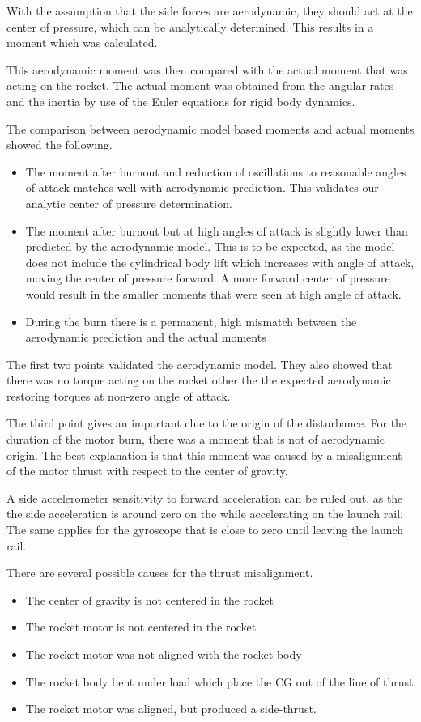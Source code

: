 With the assumption that the side forces are aerodynamic, they should act at the center of pressure, which can be analytically determined.
This results in a moment which was calculated.

This aerodynamic moment was then compared with the actual moment that was acting on the rocket.
The actual moment was obtained from the angular rates and the inertia by use of the Euler equations for rigid body dynamics.

The comparison between aerodynamic model based moments and actual moments showed the following.
\begin{itemize}
\item The moment after burnout and reduction of oscillations to reasonable angles of attack matches well with aerodynamic prediction. This validates our analytic center of pressure determination.
\item The moment after burnout but at high angles of attack is slightly lower than predicted by the aerodynamic model. This is to be expected, as the model does not include the cylindrical body lift which increases with angle of attack, moving the center of pressure forward. A more forward center of pressure would result in the smaller moments that were seen at high angle of attack.
\item During the burn there is a permanent, high mismatch between the aerodynamic prediction and the actual moments
\end{itemize}

The first two points validated the aerodynamic model.
They also showed that there was no torque acting on the rocket other the the expected aerodynamic restoring torques at non-zero angle of attack.

The third point gives an important clue to the origin of the disturbance. For the duration of the motor burn, there was a moment that is not of aerodynamic origin.
The best explanation is that this moment was caused by a misalignment of the motor thrust with respect to the center of gravity.

A side accelerometer sensitivity to forward acceleration can be ruled out, as the the side acceleration is around zero on the while accelerating on the launch rail.
The same applies for the gyroscope that is close to zero until leaving the launch rail.

There are several possible causes for the thrust misalignment.
\begin{itemize}
    \item The center of gravity is not centered in the rocket
    \item The rocket motor is not centered in the rocket
    \item The rocket motor was not aligned with the rocket body
    \item The rocket body bent under load which place the CG out of the line of thrust
    \item The rocket motor was aligned, but produced a side-thrust.
\end{itemize}





